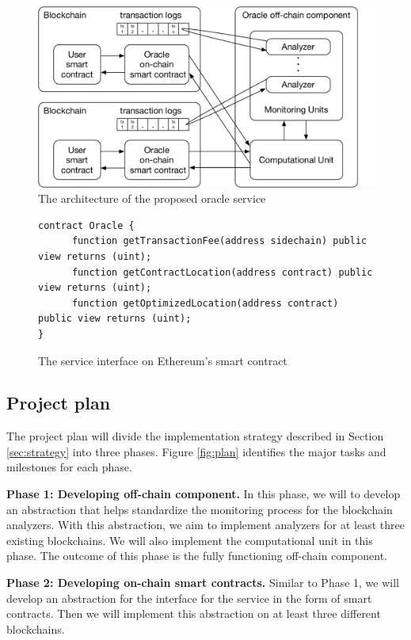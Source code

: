 \begin{figure}[ht!]
\begin{minipage}[b]{1\linewidth}
\centering
      \includegraphics[width=0.6\linewidth]{figures/architecture}
\end{minipage}
\caption{The architecture of the proposed oracle service}
\label{fig:architecture}
\end{figure}

\begin{figure}[ht!]
\begin{lstlisting}[language=Solidity,numbers=none]
contract Oracle {
      function getTransactionFee(address sidechain) public view returns (uint);
      function getContractLocation(address contract) public view returns (uint);
      function getOptimizedLocation(address contract) public view returns (uint);
}
\end{lstlisting}
\caption{The service interface on Ethereum's smart contract}
\label{fig:contract}
\end{figure}


\subsection{Project plan}
The project plan will divide the implementation strategy described in Section
\ref{sec:strategy} into three phases. Figure \ref{fig:plan} identifies the major
tasks and milestones for each phase.

\textbf{Phase 1: Developing off-chain component.} In this phase, we will to
develop an abstraction that helps standardize the monitoring process for the
blockchain analyzers. With this abstraction, we aim to implement analyzers for
at least three existing blockchains. We will also implement the computational
unit in this phase. The outcome of this phase is the fully functioning off-chain
component.

\textbf{Phase 2: Developing on-chain smart contracts.} Similar to Phase 1, we
will develop an abstraction for the interface for the service in the form of smart
contracts. Then we will implement this abstraction on at least three different
blockchains.

